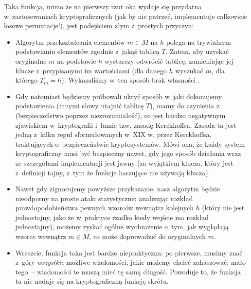 Taka funkcja, mimo że na pierwszy rzut oka wydaje się przydatna
w~zastosowaniach kryptograficznych (jak by nie patrzeć, implementuje całkowicie
losowe permutacje!), jest podejściem złym z~prostych przyczyn:

\begin{itemize}

    \item Algorytm przekształcania elementów $m \in M$ na $h$ polega na
    trywialnym podstawianiu elementów zgodnie z~jakąś tablicą $T$. Zatem, aby
    uzyskać oryginalne $m$ na podstawie $h$ wystarczy odwrócić tablicę,
    zamieniając jej klucze z~przypisanymi im wartościami (dla danego $h$
    wyszukać $m$, dla którego $T_m = h$). Wykazaliśmy w~ten sposób brak
    własności .

    \item Gdy natomiast będziemy próbowali ukryć sposób w~jaki dokonujemy
    podstawienia (innymi słowy utajnić tablicę $T$), mamy do czynienia
    z~ (bezpieczeństwo poprzez niezrozumiałość),
    co jest bardzo negatywnym zjawiskiem w~kryptografii i~łamie tzw. zasadę
    Kerckhoffsa. Zasada ta jest jedną z~kilku reguł sformułowanych w~XIX w.
    przez Kerckhoffsa, traktujących o~bezpieczeństwie kryptosystemów. Mówi ona,
    że każdy system kryptograficzny musi być bezpieczny nawet, gdy jego sposób
    działania wraz ze szczegółami implementacji jest jawny (za wyjątkiem
    klucza, który jest z~definicji tajny, z~tym że funkcje haszujące nie
    używają klucza).

    \item Nawet gdy zignorujemy powyższe przykazanie, nasz algorytm będzie
    nieodporny na proste ataki statystyczne: analizując rozkład
    prawdopodobieństwa pewnych wzorców wewnątrz kolejnych $h$ (który nie jest
    jednostajny, jako że w~praktyce rzadko kiedy wejście ma rozkład
    jednostajny), możemy zyskać ogólne wyobrażenie o~tym, jak wyglądają wzorce
    wewnątrz $m \in M$, co może doprowadzić do oryginalnych $m$.

    \item Wreszcie, funkcja taka jest bardzo niepraktyczna: po pierwsze, musimy
    znać z~góry \emph{wszystkie} możliwe wiadomości, jakie możemy chcieć
    zahaszować; mało tego~-- wiadomości te muszą mieć tę samą długość. Powoduje
    to, że funkcja ta nie nadaje się na kryptograficzną funkcję skrótu.

\end{itemize}



